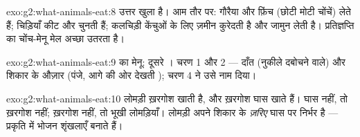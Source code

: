\begin{solution}{exo:g2:what-animals-eat:8}
उत्तर खुला है। आम तौर पर: गौरैया और फ़िंच (छोटी मोटी चोंचें)  लेते
हैं; चिड़ियाँ कीट और  चुनती हैं; कलचिड़ी केंचुओं के लिए ज़मीन कुरेदती
है और जामुन लेती है। प्रतिज्ञप्ति का चोंच-मेनू मेल अच्छा उतरता है।
\end{solution}

\begin{solution}{exo:g2:what-animals-eat:9}
 का मेनू: दूसरे । चरण 1 और 2 --- दाँत (नुकीले दबोचने
वाले) और शिकार के औज़ार (पंजे, आगे की ओर देखती ); चरण 4 ने उसे
नाम दिया।
\end{solution}

\begin{solution}{exo:g2:what-animals-eat:10}
लोमड़ी ख़रगोश खाती है, और ख़रगोश घास खाते हैं। घास नहीं, तो ख़रगोश
नहीं; ख़रगोश नहीं, तो भूखी लोमड़ियाँ। लोमड़ी अपने शिकार के \emph{ज़रिए}
घास पर निर्भर है --- प्रकृति में भोजन शृंखलाएँ बनाते हैं।
\end{solution}
